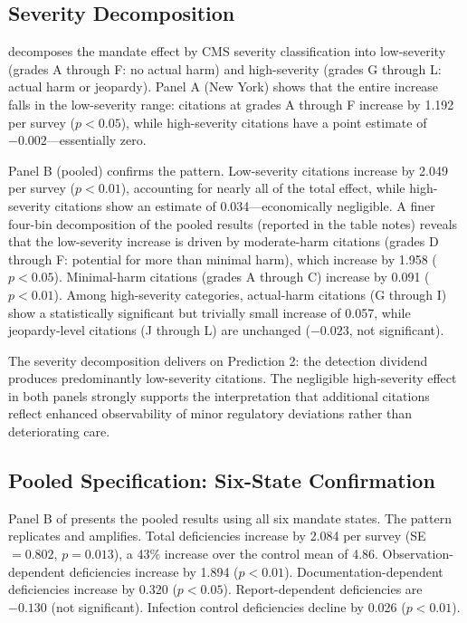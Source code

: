 \documentclass[12pt]{article}
\begin{document}
\subsection{Severity Decomposition}



 decomposes the mandate effect by CMS severity classification into low-severity (grades A through F: no actual harm) and high-severity (grades G through L: actual harm or jeopardy). Panel A (New York) shows that the entire increase falls in the low-severity range: citations at grades A through F increase by 1.192 per survey ($p < 0.05$), while high-severity citations have a point estimate of $-0.002$---essentially zero.

Panel B (pooled) confirms the pattern. Low-severity citations increase by 2.049 per survey ($p < 0.01$), accounting for nearly all of the total effect, while high-severity citations show an estimate of 0.034---economically negligible. A finer four-bin decomposition of the pooled results (reported in the table notes) reveals that the low-severity increase is driven by moderate-harm citations (grades D through F: potential for more than minimal harm), which increase by 1.958 ($p < 0.05$). Minimal-harm citations (grades A through C) increase by 0.091 ($p < 0.01$). Among high-severity categories, actual-harm citations (G through I) show a statistically significant but trivially small increase of 0.057, while jeopardy-level citations (J through L) are unchanged ($-0.023$, not significant).

The severity decomposition delivers on Prediction 2: the detection dividend produces predominantly low-severity citations. The negligible high-severity effect in both panels strongly supports the interpretation that additional citations reflect enhanced observability of minor regulatory deviations rather than deteriorating care.

\subsection{Pooled Specification: Six-State Confirmation}

Panel B of  presents the pooled results using all six mandate states. The pattern replicates and amplifies. Total deficiencies increase by 2.084 per survey (SE $= 0.802$, $p = 0.013$), a 43\% increase over the control mean of 4.86. Observation-dependent deficiencies increase by 1.894 ($p < 0.01$). Documentation-dependent deficiencies increase by 0.320 ($p < 0.05$). Report-dependent deficiencies are $-0.130$ (not significant). Infection control deficiencies decline by 0.026 ($p < 0.01$).
\end{document}
